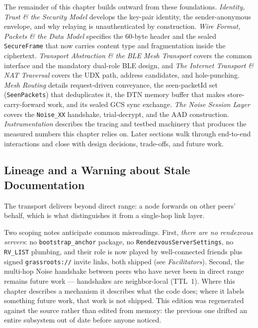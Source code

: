 \documentclass[11pt]{report}
\newcommand{\code}[1]{\texttt{\small #1}}
\begin{document}
The remainder of this chapter builds outward from these foundations. \emph{Identity, Trust \& the Security Model} develops the key-pair identity, the sender-anonymous envelope, and why relaying is unauthenticated by construction. \emph{Wire Format, Packets \& the Data Model} specifies the 60-byte header and the sealed \code{SecureFrame} that now carries content type and fragmentation inside the ciphertext. \emph{Transport Abstraction \& the BLE Mesh Transport} covers the common interface and the mandatory dual-role BLE design, and \emph{The Internet Transport \& NAT Traversal} covers the UDX path, address candidates, and hole-punching. \emph{Mesh Routing} details request-driven conveyance, the seen-packetId set (\code{SeenPackets}) that deduplicates it, the DTN memory buffer that makes store-carry-forward work, and its sealed GCS sync exchange. \emph{The Noise Session Layer} covers the \code{Noise_XX} handshake, trial-decrypt, and the AAD construction. \emph{Instrumentation} describes the tracing and testbed machinery that produces the measured numbers this chapter relies on. Later sections walk through end-to-end interactions and close with design decisions, trade-offs, and future work.

\subsection{Lineage and a Warning about Stale Documentation}

The transport delivers beyond direct range: a node forwards on other peers' behalf, which is what distinguishes it from a single-hop link layer.

Two scoping notes anticipate common misreadings. First, \emph{there are no rendezvous servers}: no \code{bootstrap\_anchor} package, no \code{RendezvousServerSettings}, no \code{RV\_LIST} plumbing, and their role is now played by well-connected friends plus signed \code{grassroots://} invite links, both shipped (see \emph{Facilitators}). Second, the multi-hop Noise handshake between peers who have never been in direct range remains future work --- handshakes are neighbor-local (TTL~1). Where this chapter describes a mechanism it describes what the code does; where it labels something future work, that work is not shipped. This edition was regenerated against the source rather than edited from memory: the previous one drifted an entire subsystem out of date before anyone noticed.
\end{document}

